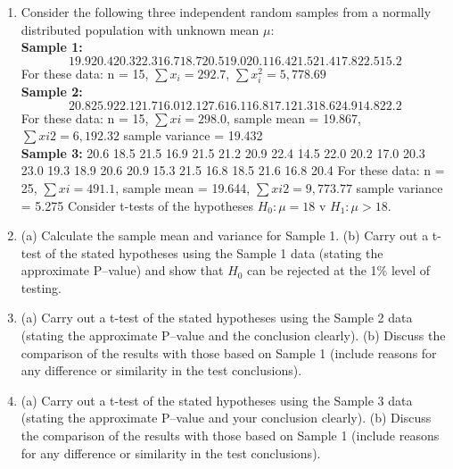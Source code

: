 \documentclass[a4paper,12pt]{article}
\begin{document}
\begin{enumerate}
\item %
Consider the following three independent random samples from a normally distributed population with unknown mean $\mu$:
\\
\noindent \textbf{Sample 1:}
\[19.9 20.4 20.3 22.3 16.7 18.7 20.5 19.0 20.1 16.4 21.5 21.4 17.8 22.5 15.2\]
For these data: n = 15,
$\sum x_i = 292.7$,
$\sum x_i^2 = 5,778.69$
\\
\noindent \textbf{Sample 2:}
\[20.8 25.9 22.1 21.7 16.0 12.1 27.6 16.1 16.8 17.1 21.3 18.6 24.9 14.8 22.2\]
For these data: n = 15,
$\sum x i = 298.0$,
sample mean = 19.867,
$\sum x i 2 = 6,192.32$
sample variance = 19.432
\\
\noindent \textbf{Sample 3:}
20.6 18.5 21.5 16.9 21.5 21.2 20.9 22.4 14.5 22.0 20.2 17.0 20.3 23.0 19.3
18.9 20.6 20.9 15.3 21.5 16.8 18.5 21.6 16.8 20.4
For these data: n = 25, $\sum x i = 491.1$,
sample mean = 19.644,
$\sum x i 2 = 9, 773.77$
sample variance = 5.275
Consider t-tests of the hypotheses $H_0 : \mu = 18$ v $H_1 : \mu > 18$.
\item 

(a) Calculate the sample mean and variance for Sample 1.
(b) Carry out a t-test of the stated hypotheses using the Sample 1 data (stating the approximate P–value) and show that $H_0$  can be rejected at the 1\% level of testing.
\item 
(a) Carry out a t-test of the stated hypotheses using the Sample 2 data (stating the approximate P–value and the conclusion clearly).
(b) Discuss the comparison of the results with those based on Sample 1 (include reasons for any difference or similarity in the test conclusions).

\item 
(a) Carry out a t-test of the stated hypotheses using the Sample 3 data (stating the approximate P–value and your conclusion clearly).
(b) Discuss the comparison of the results with those based on Sample 1 (include reasons for any difference or similarity in the test
conclusions).

\newpage


\end{enumerate}
\end{document}
